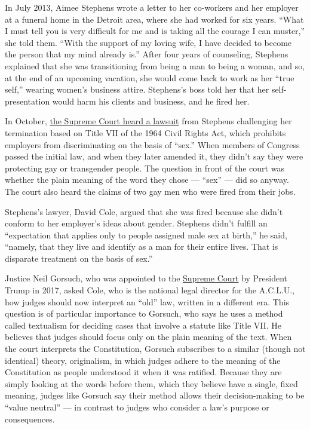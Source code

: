 In July 2013, Aimee Stephens wrote a letter to her co-workers and her
employer at a funeral home in the Detroit area, where she had worked for
six years. ``What I must tell you is very difficult for me and is taking
all the courage I can muster,'' she told them. ``With the support of my
loving wife, I have decided to become the person that my mind already
is.'' After four years of counseling, Stephens explained that she was
transitioning from being a man to being a woman, and so, at the end of
an upcoming vacation, she would come back to work as her ``true self,''
wearing women's business attire. Stephens's boss told her that her
self-presentation would harm his clients and business, and he fired her.

In October,
\href{https://www.supremecourt.gov/oral_arguments/argument_transcripts/2019/18-107_c18e.pdf}{the
Supreme Court heard a lawsuit} from Stephens challenging her termination
based on Title VII of the 1964 Civil Rights Act, which prohibits
employers from discriminating on the basis of ``sex.'' When members of
Congress passed the initial law, and when they later amended it, they
didn't say they were protecting gay or transgender people. The question
in front of the court was whether the plain meaning of the word they
chose --- ``sex'' --- did so anyway. The court also heard the claims of
two gay men who were fired from their jobs.

Stephens's lawyer, David Cole, argued that she was fired because she
didn't conform to her employer's ideas about gender. Stephens didn't
fulfill an ``expectation that applies only to people assigned male sex
at birth,'' he said, ``namely, that they live and identify as a man for
their entire lives. That is disparate treatment on the basis of sex.''

Justice Neil Gorsuch, who was appointed to the
\href{https://www.nytimes3xbfgragh.onion/2020/04/20/us/politics/supreme-court-unanimous-verdicts.html}{Supreme
Court} by President Trump in 2017, asked Cole, who is the national legal
director for the A.C.L.U., how judges should now interpret an ``old''
law, written in a different era. This question is of particular
importance to Gorsuch, who says he uses a method called textualism for
deciding cases that involve a statute like Title VII. He believes that
judges should focus only on the plain meaning of the text. When the
court interprets the Constitution, Gorsuch subscribes to a similar
(though not identical) theory, originalism, in which judges adhere to
the meaning of the Constitution as people understood it when it was
ratified. Because they are simply looking at the words before them,
which they believe have a single, fixed meaning, judges like Gorsuch say
their method allows their decision-making to be ``value neutral'' --- in
contrast to judges who consider a law's purpose or consequences.

